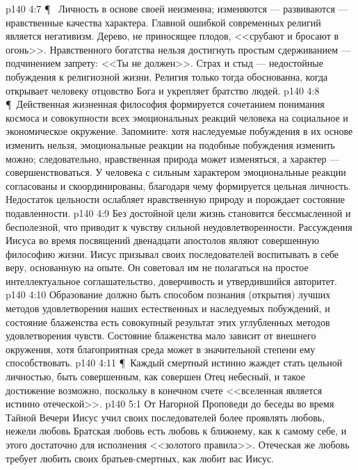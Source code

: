 \vs p140 4:7 \P\  Личность в основе своей неизменна; изменяются --- развиваются --- нравственные качества характера. Главной ошибкой современных религий является негативизм. Дерево, не приносящее плодов, <<срубают и бросают в огонь>>. Нравственного богатства нельзя достигнуть простым сдерживанием --- подчинением запрету: <<Ты не должен>>. Страх и стыд --- недостойные побуждения к религиозной жизни. Религия только тогда обоснованна, когда открывает человеку отцовство Бога и укрепляет братство людей.
\vs p140 4:8 \P\ Действенная жизненная философия формируется сочетанием понимания космоса и совокупности всех эмоциональных реакций человека на социальное и экономическое окружение. Запомните: хотя наследуемые побуждения в их основе изменить нельзя, эмоциональные реакции на подобные побуждения изменить можно; следовательно, нравственная природа может изменяться, а характер --- совершенствоваться. У человека с сильным характером эмоциональные реакции согласованы и скоординированы, благодаря чему формируется цельная личность. Недостаток цельности ослабляет нравственную природу и порождает состояние подавленности.
\vs p140 4:9 Без достойной цели жизнь становится бессмысленной и бесполезной, что приводит к чувству сильной неудовлетворенности. Рассуждения Иисуса во время посвящений двенадцати апостолов являют совершенную философию жизни. Иисус призывал своих последователей воспитывать в себе веру, основанную на опыте. Он советовал им не полагаться на простое интеллектуальное соглашательство, доверчивость и утвердившийся авторитет.
\vs p140 4:10 Образование должно быть способом познания (открытия) лучших методов удовлетворения наших естественных и наследуемых побуждений, и состояние блаженства есть совокупный результат этих углубленных методов удовлетворения чувств. Состояние блаженства мало зависит от внешнего окружения, хотя благоприятная среда может в значительной степени ему способствовать.
\vs p140 4:11 \P\ Каждый смертный истинно жаждет стать цельной личностью, быть совершенным, как совершен Отец небесный, и такое достижение возможно, поскольку в конечном счете <<вселенная является истинно отеческой>>.
\vs p140 5:1 От Нагорной Проповеди до беседы во время Тайной Вечери Иисус учил своих последователей более проявлять  любовь, нежели любовь  Братская любовь есть любовь к ближнему, как к самому себе, и этого достаточно для исполнения <<золотого правила>>. Отеческая же любовь требует любить своих братьев\hyp{}смертных, как любит вас Иисус.
